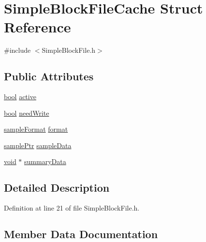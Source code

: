 \hypertarget{struct_simple_block_file_cache}{}\section{Simple\+Block\+File\+Cache Struct Reference}
\label{struct_simple_block_file_cache}


{\ttfamily \#include $<$Simple\+Block\+File.\+h$>$}

\subsection*{Public Attributes}
\begin{DoxyCompactItemize}
\item 
\hyperlink{mac_2config_2i386_2lib-src_2libsoxr_2soxr-config_8h_abb452686968e48b67397da5f97445f5b}{bool} \hyperlink{struct_simple_block_file_cache_a2090e839cbaa60de4f78a735a8c53875}{active}
\item 
\hyperlink{mac_2config_2i386_2lib-src_2libsoxr_2soxr-config_8h_abb452686968e48b67397da5f97445f5b}{bool} \hyperlink{struct_simple_block_file_cache_a9e8bec65ced21f444549093313266110}{need\+Write}
\item 
\hyperlink{include_2audacity_2_types_8h_a9938d2e2f6adef23e745cd80ef379792}{sample\+Format} \hyperlink{struct_simple_block_file_cache_aa4ce205b9532adab61459334240a216c}{format}
\item 
\hyperlink{include_2audacity_2_types_8h_aaafb46d1caf7c79262fec96b577215fe}{sample\+Ptr} \hyperlink{struct_simple_block_file_cache_a1726dd879f6f356eff8165c04dc039d2}{sample\+Data}
\item 
\hyperlink{sound_8c_ae35f5844602719cf66324f4de2a658b3}{void} $\ast$ \hyperlink{struct_simple_block_file_cache_a4e097d86a1b1b1bada818e5fc6ae7d60}{summary\+Data}
\end{DoxyCompactItemize}


\subsection{Detailed Description}


Definition at line 21 of file Simple\+Block\+File.\+h.



\subsection{Member Data Documentation}
